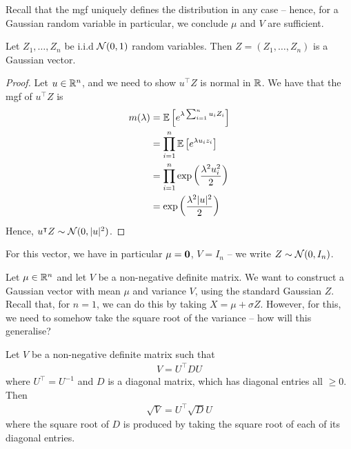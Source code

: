 \documentclass{../../template/note}
\begin{document}
    Recall that the mgf uniquely defines the distribution in any case -- hence, for a Gaussian random variable in particular, we conclude \(\mu\) and \(V\) are sufficient.
    
    \begin{lemma}
        Let \(Z_1, \dots, Z_n\) be i.i.d \(\mathcal{N}(0, 1)\) random variables. Then \(Z = (Z_1, \dots, Z_n)\) is a Gaussian vector.
    \end{lemma}
    
    \begin{proof}
        Let \(u \in \mathbb R^n\), and we need to show \(u^\intercal Z\) is normal in \(\mathbb R\). We have that the mgf of \(u^\intercal Z\) is
        \begin{align*}
            m(\lambda) &= \mathbb E\left[e^{\lambda \sum_{i=1}^n u_iZ_i}\right] \\
            &= \prod_{i=1}^n \mathbb E\left[e^{\lambda u_i z_i}\right] \\
            &= \prod_{i=1}^n \exp\left(\frac{\lambda^2u_i^2}2\right) \\
            &= \exp\left(\frac{\lambda^2|u|^2}2\right)
        \end{align*}
        Hence, \(u^\intercal Z \sim \mathcal{N}(0, |u|^2)\).
    \end{proof}
    
    \begin{remark*}
        For this vector, we have in particular \(\mu = \V 0\), \(V = I_n\) -- we write \(Z \sim \mathcal{N}(0, I_n)\).
    \end{remark*}
    
    Let \(\mu \in \mathbb R^n\) and let \(V\) be a non-negative definite matrix. We want to construct a Gaussian vector with mean \(\mu\) and variance \(V\), using the standard Gaussian \(Z\). Recall that, for \(n=1\), we can do this by taking \(X = \mu + \sigma Z\). However, for this, we need to somehow take the square root of the variance -- how will this generalise?

    \begin{definition}
        Let \(V\) be a non-negative definite matrix such that
        \begin{align*}
            V = U^\intercal D U
        \end{align*}
        where \(U^\intercal = U^{-1}\) and \(D\) is a diagonal matrix, which has diagonal entries all \(\geq 0\). Then
        \begin{align*}
            \sqrt V = U^\intercal \sqrt D U
        \end{align*}
        where the square root of \(D\) is produced by taking the square root of each of its diagonal entries.       
    \end{definition}
    
\end{document}
